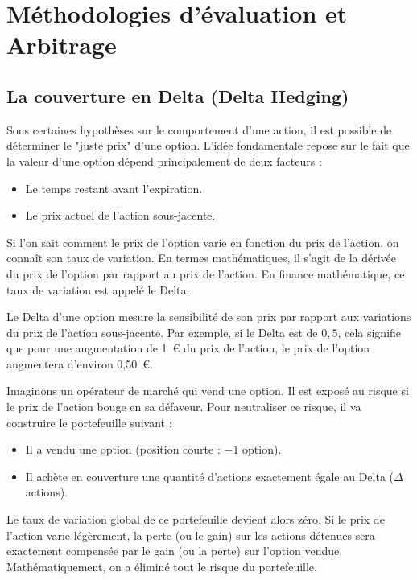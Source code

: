 
\section{Méthodologies d'évaluation et Arbitrage}

\subsection{La couverture en Delta (Delta Hedging)}

Sous certaines hypothèses sur le comportement d'une action, il est possible de déterminer le "juste prix" d'une option. L'idée fondamentale repose sur le fait que la valeur d'une option dépend principalement de deux facteurs :
\begin{itemize}[label=$\rightarrow$]
    \item Le temps restant avant l'expiration.
    \item Le prix actuel de l'action sous-jacente.
\end{itemize}
Si l'on sait comment le prix de l'option varie en fonction du prix de l'action, on connaît son taux de variation. En termes mathématiques, il s'agit de la dérivée du prix de l'option par rapport au prix de l'action. En finance mathématique, ce taux de variation est appelé le Delta.

\begin{definitionbox}
Le Delta d'une option mesure la sensibilité de son prix par rapport aux variations du prix de l'action sous-jacente. 
Par exemple, si le Delta est de $0,5$, cela signifie que pour une augmentation de 1~€ du prix de l'action, le prix de l'option augmentera d'environ 0,50~€.
\end{definitionbox}

\begin{examplebox}
Imaginons un opérateur de marché qui vend une option. Il est exposé au risque si le prix de l'action bouge en sa défaveur. Pour neutraliser ce risque, il va construire le portefeuille suivant :
\begin{itemize}[label=$\rightarrow$]
    \item Il a vendu une option (position courte : $-1$ option).
    \item Il achète en couverture une quantité d'actions exactement égale au Delta ($\Delta$ actions).
\end{itemize}
Le taux de variation global de ce portefeuille devient alors zéro. Si le prix de l'action varie légèrement, la perte (ou le gain) sur les actions détenues sera exactement compensée par le gain (ou la perte) sur l'option vendue. Mathématiquement, on a éliminé tout le risque du portefeuille.
\end{examplebox}

